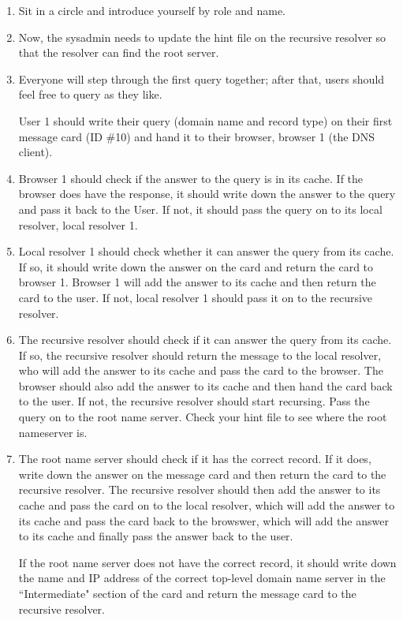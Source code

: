 \documentclass[11pt,a4paper]{article}
\begin{document}
\begin{enumerate}
\item Sit in a circle and introduce yourself by role and name. 
\item Now, the sysadmin needs to update the hint file on the recursive resolver so that the resolver can find the root server.
\item Everyone will step through the first query together; after that, users should feel free to query as they like.

User 1 should write their query (domain name and record type) on their first message card (ID \#10) and hand it to their browser, browser 1 (the DNS client).
\item Browser 1 should check if the answer to the query is in its cache. 
If the browser does have the response, it should write down the answer to the query and pass it back to the User.
If not, it should pass the query on to its local resolver, local resolver 1. 
\item Local resolver 1 should check whether it can answer the query from its cache.
If so, it should write down the answer on the card and return the card to browser 1.
Browser 1 will add the answer to its cache and then return the card to the user. 
If not, local resolver 1 should pass it on to the recursive resolver.
\item The recursive resolver should check if it can answer the query from its cache. 
If so, the recursive resolver should return the message to the local resolver, who will add the answer to its cache and pass the card to the browser.
The browser should also add the answer to its cache and then hand the card back to the user.
 If not, the recursive resolver should start recursing. 
Pass the query on to the root name server. 
Check your hint file to see where the root nameserver is.
\item The root name server should check if it has the correct record.
If it does, write down the answer on the message card and then return the card to the recursive resolver. The recursive resolver should then add the answer to its cache and pass the card on to the local resolver, which will add the answer to its cache and pass the card back to the browswer, which will add the answer to its cache and finally pass the answer back to the user.

If the root name server does not have the correct record, it should write down the name and IP address of the correct top-level domain name server in the ``Intermediate" section of the card and return the message card to the recursive resolver. 


\end{enumerate}
\end{document}

